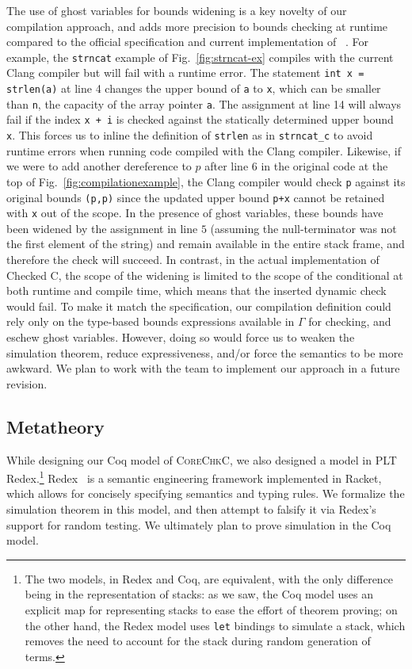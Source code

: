 \documentclass[conference]{IEEEtran}
\newcommand{\code}[1]{\lstinline|#1|}
\newcommand{\lang}{\textsc{CoreChkC}\xspace}
\newcommand{\checkedc}{\text{Checked C}\xspace}
\begin{document}
The use of ghost variables for bounds widening is a key novelty of our
compilation approach, and adds more precision to bounds checking at runtime
compared to the official specification and current implementation of
\checkedc~\cite[5.1.2, pg 85]{checkedc}.  For example, the
\code{strncat} example of Fig.~\ref{fig:strncat-ex} compiles with the
current Clang \checkedc compiler but will fail with a runtime
error. The statement \code{int x = strlen(a)} at line 4 changes the
upper bound of \code{a} to \code{x}, which can be smaller than
\code{n}, the capacity of the array pointer \code{a}. The assignment
at line 14 will always fail if the index \code{x + i} is checked
against the statically determined upper bound
\code{x}. This forces us to inline the definition of \code{strlen} as
in \code{strncat_c} to avoid runtime errors when running code compiled with the
Clang \checkedc compiler.  Likewise, if we were to add another dereference to
$p$ after line 6 in the original code at the top of
Fig.~\ref{fig:compilationexample}, the Clang \checkedc
compiler would 
check \code{p} against its original bounds \code{(p,p)} since the
updated upper bound \code{p+x} cannot be retained with \code{x} out of
the scope. In the presence of ghost variables,
these bounds have been widened by the assignment in line $5$ (assuming
the null-terminator was not the first element of the string) and
remain available in the entire stack frame, and
therefore the check will succeed. In contrast, in the actual
implementation of Checked C, the scope of the widening is limited to
the scope of the conditional at both runtime and compile time, which means that the inserted dynamic
check would fail.
To make it match the specification, our compilation definition could
rely only on the type-based bounds expressions available in $\Gamma$
for checking, and eschew ghost variables. However, doing so would
force us to weaken the simulation theorem, reduce expressiveness,
and/or force the semantics to be more awkward. We plan to work with
the \checkedc team to implement our approach in a future revision.

\subsection{Metatheory}
\label{sec:meta}

While designing our Coq model of \lang, we also designed a model in
PLT Redex.\footnote{The two models, in Redex and Coq, are
  equivalent, with the only difference being in the representation of
  stacks: as we saw, the Coq model uses an explicit map for
  representing stacks to ease the effort of theorem proving; on the
  other hand, the Redex model uses \texttt{let} bindings to simulate a
  stack, which removes the need to account for the stack during random
  generation of terms.}  Redex~\cite{pltredex} is a semantic
engineering framework implemented in Racket, which allows for
concisely specifying semantics and typing rules. We
formalize the simulation theorem in this model, and then attempt to
falsify it via Redex's support for random testing. We ultimately plan
to prove simulation in the Coq model.
\end{document}
